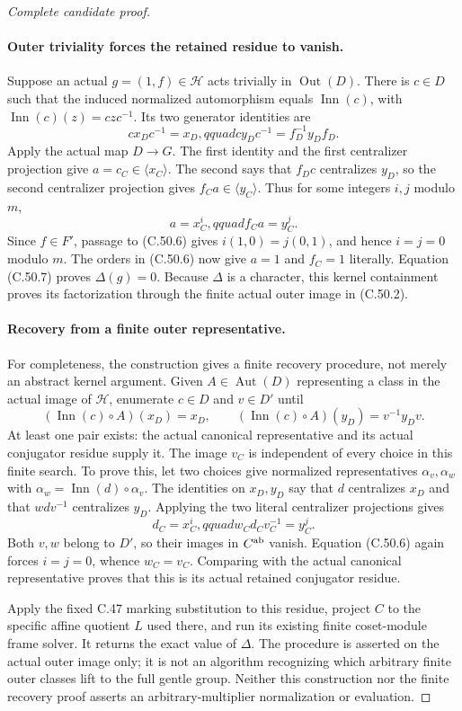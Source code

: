 \begin{proof}[Complete candidate proof]
\paragraph{Outer triviality forces the retained residue to vanish.}
Suppose an actual $g=(1,f)\in\mathcal H$ acts trivially in
$\operatorname{Out}(D)$. There is $c\in D$ such that the
induced normalized automorphism equals $\operatorname{Inn}(c)$,
with $\operatorname{Inn}(c)(z)=czc^{-1}$. Its two generator
identities are
\[
             cx_Dc^{-1}=x_D,qquad
             c y_Dc^{-1}=f_D^{-1}y_Df_D.             \tag{C.50.11}
\]
Apply the actual map $D\to G$. The first identity and the first
centralizer projection give $a=c_C\in\langle x_C\rangle$.
The second says that $f_Dc$ centralizes $y_D$, so the second
centralizer projection gives $f_Ca\in\langle y_C\rangle$.
Thus for some integers $i,j$ modulo $m$,
\[
                     a=x_C^i,qquad f_Ca=y_C^j.       \tag{C.50.12}
\]
Since $f\in F'$, passage to (C.50.6) gives
$i(1,0)=j(0,1)$, and hence $i=j=0$ modulo $m$.
The orders in (C.50.6) now give $a=1$ and $f_C=1$ literally.
Equation (C.50.7) proves $\Delta(g)=0$.
Because $\Delta$ is a character, this kernel containment proves
its factorization through the finite actual outer image in
(C.50.2).

\paragraph{Recovery from a finite outer representative.}
For completeness, the construction gives a finite recovery procedure,
not merely an abstract kernel argument. Given
$A\in\operatorname{Aut}(D)$ representing a class in the actual
image of $\mathcal H$, enumerate $c\in D$ and $v\in D'$ until
\[
 (\operatorname{Inn}(c)\circ A)(x_D)=x_D,\qquad
 (\operatorname{Inn}(c)\circ A)(y_D)=v^{-1}y_Dv.       \tag{C.50.13}
\]
At least one pair exists: the actual canonical representative and its
actual conjugator residue supply it. The image $v_C$ is independent
of every choice in this finite search. To prove this, let two choices
give normalized representatives $\alpha_v,\alpha_w$ with
$\alpha_w=\operatorname{Inn}(d)\circ\alpha_v$.
The identities on $x_D,y_D$ say that $d$ centralizes $x_D$
and that $wdv^{-1}$ centralizes $y_D$. Applying the two literal
centralizer projections gives
\[
                  d_C=x_C^i,qquad w_Cd_Cv_C^{-1}=y_C^j.
                                                               \tag{C.50.14}
\]
Both $v,w$ belong to $D'$, so their images in $C^{\rm ab}$
vanish. Equation (C.50.6) again forces $i=j=0$, whence
$w_C=v_C$. Comparing with the actual canonical representative
proves that this is its actual retained conjugator residue.

Apply the fixed C.47 marking substitution to this residue, project
$C$ to the specific affine quotient $L$ used there, and run its
existing finite coset-module frame solver. It returns the exact
value of $\Delta$. The procedure is asserted on the actual outer
image only; it is not an algorithm recognizing which arbitrary
finite outer classes lift to the full gentle group. Neither this
construction nor the finite recovery proof asserts an
arbitrary-multiplier normalization or evaluation.
\end{proof}
